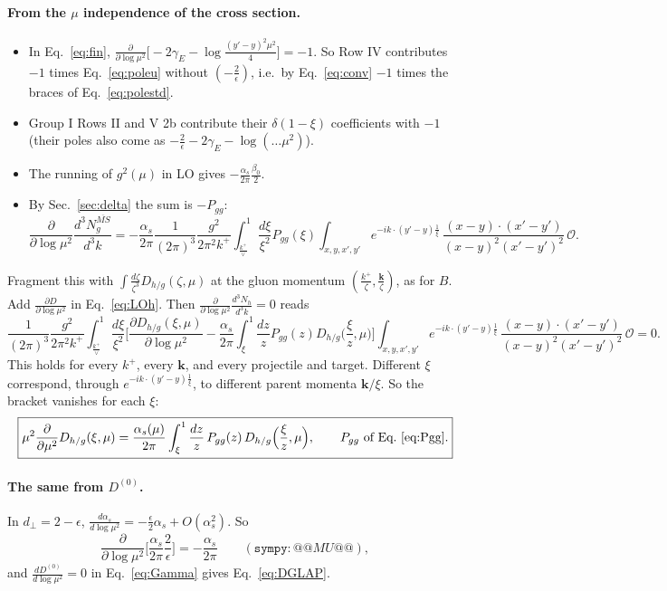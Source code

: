 \documentclass[10pt]{article}
\numberwithin{equation}{section}
\newcommand{\OO}{\mathcal O}
\newcommand{\preLO}{\frac{1}{(2\pi)^3}\frac{g^2}{2\pi^2k^+}}
\newcommand{\XX}{\frac{(x-y)\cdot(x'-y')}{(x-y)^{2}(x'-y')^{2}}}
\newcommand{\ph}{e^{-ik\cdot(y'-y)\frac{1}{\xi}}}
\begin{document}
\paragraph{From the $\mu$ independence of the cross section.}
\begin{itemize}
\item In Eq.~\eqref{eq:fin}, $\frac{\partial}{\partial\log\mu^2}\big[-2\gamma_E-\log\frac{(y'-y)^2\mu^2}{4}\big]=-1$. So Row IV contributes $-1$ times Eq.~\eqref{eq:poleu} without $(-\frac{2}{\epsilon})$, i.e.\ by Eq.~\eqref{eq:conv} $-1$ times the braces of Eq.~\eqref{eq:polestd}.
\item Group I Rows II and V 2b contribute their $\delta(1-\xi)$ coefficients with $-1$ (their poles also come as $-\frac2\epsilon-2\gamma_E-\log(\dots\mu^2)$).
\item The running of $g^2(\mu)$ in LO gives $-\frac{\alpha_s}{2\pi}\frac{\beta_0}{2}$.
\item By Sec.~\ref{sec:delta} the sum is $-P_{gg}$:
\begin{equation*}
\frac{\partial}{\partial\log\mu^2}\frac{d^3N^{\overline{MS}}_g}{d^3k}=-\frac{\alpha_s}{2\pi}\preLO\int_{\frac{k^+}{\vee}}^1\frac{d\xi}{\xi^2}P_{gg}(\xi)\int_{x,y,x',y'}\ph\,\XX\,\OO .
\end{equation*}
\end{itemize}
Fragment this with $\int\frac{d\zeta}{\zeta^3}D_{h/g}(\zeta,\mu)$ at the gluon momentum $(\frac{k^+}{\zeta},\frac{\mathbf k}{\zeta})$, as for $B$. Add $\frac{\partial D}{\partial\log\mu^2}$ in Eq.~\eqref{eq:LOh}. Then $\frac{\partial}{\partial\log\mu^2}\frac{d^3N_h}{d^3k}=0$ reads
\begin{equation}
\preLO\int_{\frac{k^+}{\vee}}^1\frac{d\xi}{\xi^2}\Big[\frac{\partial D_{h/g}(\xi,\mu)}{\partial\log\mu^2}-\frac{\alpha_s}{2\pi}\int_\xi^1\frac{dz}{z}P_{gg}(z)D_{h/g}\Big(\frac{\xi}{z},\mu\Big)\Big]\int_{x,y,x',y'}\ph\,\XX\,\OO=0 .
\end{equation}
This holds for every $k^+$, every $\mathbf k$, and every projectile and target. Different $\xi$ correspond, through $\ph$, to different parent momenta $\mathbf k/\xi$. So the bracket vanishes for each $\xi$:
\begin{equation}
\boxed{\mu^2\frac{\partial}{\partial\mu^2}D_{h/g}(\xi,\mu)=\frac{\alpha_s(\mu)}{2\pi}\int_\xi^1\frac{dz}{z}\,P_{gg}(z)\,D_{h/g}\Big(\frac{\xi}{z},\mu\Big),\qquad P_{gg}\ \text{of Eq.~\eqref{eq:Pgg}}.}
\label{eq:DGLAP}
\end{equation}

\paragraph{The same from $D^{(0)}$.} In $d_\perp=2-\epsilon$, $\frac{d\alpha_s}{d\log\mu^2}=-\frac{\epsilon}{2}\alpha_s+O(\alpha_s^2)$. So
\begin{equation*}
\frac{\partial}{\partial\log\mu^2}\Big[\frac{\alpha_s}{2\pi}\frac{2}{\epsilon}\Big]=-\frac{\alpha_s}{2\pi}\qquad(\texttt{sympy}: @@MU@@),
\end{equation*}
and $\frac{dD^{(0)}}{d\log\mu^2}=0$ in Eq.~\eqref{eq:Gamma} gives Eq.~\eqref{eq:DGLAP}.
\end{document}
